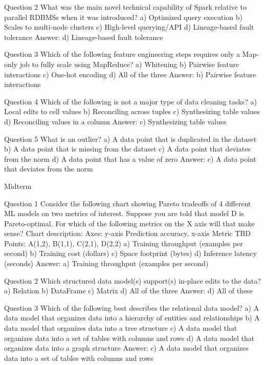   Question 2
  What was the main novel technical capability of Spark relative to parallel RDBMSs when it was introduced?
  a) Optimized query execution
  b) Scales to multi-node clusters
  c) High-level querying/API
  d) Lineage-based fault tolerance
  Answer: d) Lineage-based fault tolerance

  Question 3
  Which of the following feature engineering steps requires only a Map-only job to fully scale using MapReduce?
  a) Whitening
  b) Pairwise feature interactions
  c) One-hot encoding
  d) All of the three
  Answer: b) Pairwise feature interactions

  Question 4
  Which of the following is not a major type of data cleaning tasks?
  a) Local edits to cell values
  b) Reconciling across tuples
  c) Synthesizing table values
  d) Reconciling values in a column
  Answer: c) Synthesizing table values

  Question 5
  What is an outlier?
  a) A data point that is duplicated in the dataset
  b) A data point that is missing from the dataset
  c) A data point that deviates from the norm
  d) A data point that has a value of zero
  Answer: c) A data point that deviates from the norm


Midterm 

  Question 1
  Consider the following chart showing Pareto tradeoffs of 4 different ML models on two metrics of interest. Suppose you are told that model D is Pareto-optimal. For which of the following metrics on the X axis will that make sense?
  Chart description: 
    Axes: y-axis Prediction accuracy, x-axis Metric TBD
    Points: A(1,2), B(1,1), C(2,1), D(2,2)
  a) Training throughput (examples per second)
  b) Training cost (dollars)
  c) Space footprint (bytes)
  d) Inference latency (seconds)
  Answer: a) Training throughput (examples per second)

  Question 2
  Which structured data model(s) support(s) in-place edits to the data?
  a) Relation
  b) DataFrame
  c) Matrix
  d) All of the three
  Answer: d) All of these

  Question 3
  Which of the following best describes the relational data model?
  a) A data model that organizes data into a hierarchy of entities and relationships
  b) A data model that organizes data into a tree structure
  c) A data model that organizes data into a set of tables with columns and rows
  d) A data model that organizes data into a graph structure
  Answer: c) A data model that organizes data into a set of tables with columns and rows

